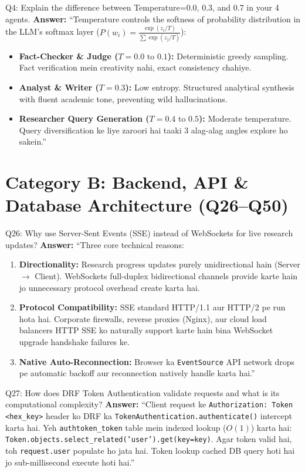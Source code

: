 \documentclass[11pt,a4paper,twoside]{report}
\begin{document}
\begin{interviewbox}{Q4: Explain the difference between Temperature=0.0, 0.3, and 0.7 in your 4 agents.}
\textbf{Answer:} ``Temperature controls the softness of probability distribution in the LLM's softmax layer ($P(w_i) = \frac{\exp(z_i / T)}{\sum \exp(z_j / T)}$):
\begin{itemize}
    \item \textbf{Fact-Checker \& Judge ($T = 0.0 \text{ to } 0.1$):} Deterministic greedy sampling. Fact verification mein creativity nahi, exact consistency chahiye.
    \item \textbf{Analyst \& Writer ($T = 0.3$):} Low entropy. Structured analytical synthesis with fluent academic tone, preventing wild hallucinations.
    \item \textbf{Researcher Query Generation ($T = 0.4 \text{ to } 0.5$):} Moderate temperature. Query diversification ke liye zaroori hai taaki 3 alag-alag angles explore ho sakein.''
\end{itemize}
\end{interviewbox}

\section{Category B: Backend, API \& Database Architecture (Q26--Q50)}

\begin{interviewbox}{Q26: Why use Server-Sent Events (SSE) instead of WebSockets for live research updates?}
\textbf{Answer:} ``Three core technical reasons:
\begin{enumerate}
    \item \textbf{Directionality:} Research progress updates purely unidirectional hain (Server $\rightarrow$ Client). WebSockets full-duplex bidirectional channels provide karte hain jo unnecessary protocol overhead create karta hai.
    \item \textbf{Protocol Compatibility:} SSE standard HTTP/1.1 aur HTTP/2 pe run hota hai. Corporate firewalls, reverse proxies (Nginx), aur cloud load balancers HTTP SSE ko naturally support karte hain bina WebSocket upgrade handshake failures ke.
    \item \textbf{Native Auto-Reconnection:} Browser ka \texttt{EventSource} API network drops pe automatic backoff aur reconnection natively handle karta hai.''
\end{enumerate}
\end{interviewbox}

\begin{interviewbox}{Q27: How does DRF Token Authentication validate requests and what is its computational complexity?}
\textbf{Answer:} ``Client request ke \texttt{Authorization: Token <hex\_key>} header ko DRF ka \texttt{TokenAuthentication.authenticate()} intercept karta hai.
Yeh \texttt{authtoken\_token} table mein indexed lookup ($O(1)$) karta hai:
\texttt{Token.objects.select\_related('user').get(key=key)}.
Agar token valid hai, toh \texttt{request.user} populate ho jata hai. Token lookup cached DB query hoti hai jo sub-millisecond execute hoti hai.''
\end{interviewbox}
\end{document}
